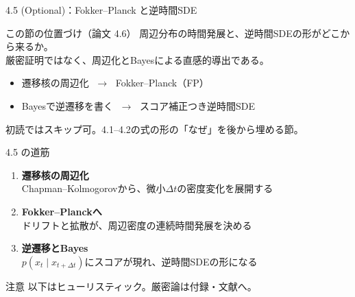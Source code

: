 

\begin{frame}{4.5 (Optional)：Fokker--Planck と逆時間SDE}
    \begin{block}{この節の位置づけ（論文 4.6）}
        周辺分布の時間発展と、逆時間SDEの形がどこから来るか。\\
        厳密証明ではなく、周辺化とBayesによる直感的導出である。
    \end{block}
    \begin{itemize}
        \item 遷移核の周辺化 $\;\to\;$ Fokker--Planck（FP）
        \item Bayesで逆遷移を書く $\;\to\;$ スコア補正つき逆時間SDE
    \end{itemize}
    \vfill
    \footnotesize
    初読ではスキップ可。4.1--4.2の式の形の「なぜ」を後から埋める節。
\end{frame}
\asmain
\begin{frame}{4.5 の道筋}
    \begin{enumerate}
        \item \textbf{遷移核の周辺化}\\
        Chapman--Kolmogorovから、微小$\Delta t$の密度変化を展開する
        \item \textbf{Fokker--Planckへ}\\
        ドリフトと拡散が、周辺密度の連続時間発展を決める
        \item \textbf{逆遷移とBayes}\\
        $p(x_t\mid x_{t+\Delta t})$にスコアが現れ、逆時間SDEの形になる
    \end{enumerate}
    \begin{alertblock}{注意}
        以下はヒューリスティック。厳密論は付録・文献へ。
    \end{alertblock}
\end{frame}
